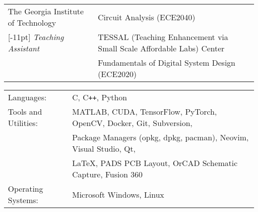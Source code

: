 \documentclass[14pt,letterpaper]{extarticle}
\begin{document}

%


\medskip\noindent
\begin{tabularx}{\linewidth}{@{}lL@{}}
\footnotesize{The Georgia Institute of Technology} & \footnotesize{Circuit Analysis (ECE2040)}\\
[-11pt]
\footnotesize{\textit{Teaching Assistant}} & \footnotesize{TESSAL (Teaching Enhancement via Small Scale Affordable Labs) Center}\\
& \footnotesize{Fundamentals of Digital System Design
(ECE2020)}\\
\end{tabularx}


\medskip\noindent
\begin{tabularx}{\linewidth}{@{}lL@{}}
\footnotesize{Languages:} & \footnotesize{C, C\texttt{++}, Python}\vspace{0.5mm}\\
\footnotesize{Tools and Utilities:} & \footnotesize{MATLAB, CUDA, TensorFlow, PyTorch, OpenCV, Docker, Git, Subversion,}\\
                                    & \footnotesize{Package Managers (opkg, dpkg, pacman), Neovim, Visual Studio, Qt,}\\
                                    & \footnotesize{\LaTeX, PADS PCB Layout, OrCAD Schematic Capture, Fusion 360}\vspace{0.5mm}\\
\footnotesize{Operating Systems:}   & \footnotesize{Microsoft Windows, Linux}\\
\end{tabularx}
\end{document}
